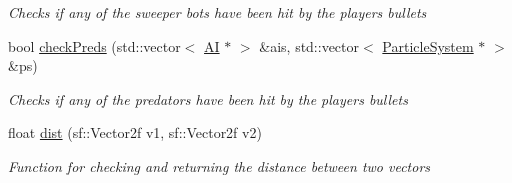 \begin{DoxyCompactItemize}
\begin{DoxyCompactList}\small\item\em Checks if any of the sweeper bots have been hit by the players bullets \end{DoxyCompactList}\item 
bool \mbox{\hyperlink{class_player_a094e0de53a41a86c8e15d4c84c6a8064}{check\+Preds}} (std\+::vector$<$ \mbox{\hyperlink{class_a_i}{AI}} $\ast$ $>$ \&ais, std\+::vector$<$ \mbox{\hyperlink{class_particle_system}{Particle\+System}} $\ast$ $>$ \&ps)
\begin{DoxyCompactList}\small\item\em Checks if any of the predators have been hit by the players bullets \end{DoxyCompactList}\item 
float \mbox{\hyperlink{class_player_aaa07ec2f61547d6420bcde4772e4347b}{dist}} (sf\+::\+Vector2f v1, sf\+::\+Vector2f v2)
\begin{DoxyCompactList}\small\item\em Function for checking and returning the distance between two vectors \end{DoxyCompactList}\end{DoxyCompactItemize}

